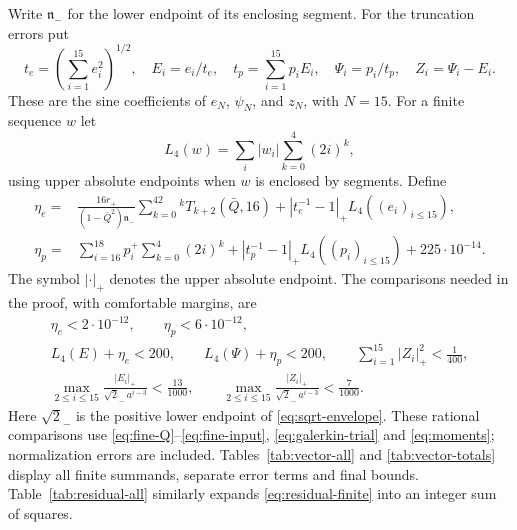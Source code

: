 Write $\mathfrak n_-$ for the lower endpoint of its enclosing segment. For the truncation errors put
\[
 t_e=\left(\sum_{i=1}^{15}e_i^2\right)^{1/2},\quad
 E_i=e_i/t_e,\quad t_p=\sum_{i=1}^{15}p_iE_i,\quad
 \Psi_i=p_i/t_p,\quad Z_i=\Psi_i-E_i.
\]
These are the sine coefficients of $e_N$, $\psi_N$, and $z_N$, with $N=15$. For a finite sequence $w$ let
\[
 L_4(w)=\sum_i |w_i|\sum_{k=0}^4(2i)^k,
\]
using upper absolute endpoints when $w$ is enclosed by segments. Define
\begin{align}
 \eta_e={}&\frac{16r_+}{(1-\bar Q^2)\mathfrak n_-}
 \sum_{k=0}^42^kT_{k+2}(\bar Q,16)
 +|t_e^{-1}-1|_+L_4((e_i)_{i\le15}),\label{eq:eta-e}\\
 \eta_p={}&\sum_{i=16}^{18}p_i^+\sum_{k=0}^4(2i)^k
 +|t_p^{-1}-1|_+L_4((p_i)_{i\le15})+225\cdot10^{-14}.
 \label{eq:eta-p}
\end{align}
The symbol $|\cdot|_+$ denotes the upper absolute endpoint. The comparisons needed in the proof, with comfortable margins, are
\begin{equation}\label{eq:vector-scalar-checks}
\begin{gathered}
 \eta_e<2\cdot10^{-12},\qquad \eta_p<6\cdot10^{-12},\\
 L_4(E)+\eta_e<200,
 \qquad L_4(\Psi)+\eta_p<200,
 \qquad\sum_{i=1}^{15}|Z_i|_+^2<\tfrac1{400},\\
 \max_{2\le i\le15}\frac{|E_i|_+}{\sqrt2_-\,a^{i-3}}<\tfrac{13}{1000},
 \qquad
 \max_{2\le i\le15}\frac{|Z_i|_+}{\sqrt2_-\,a^{i-3}}<\tfrac7{1000}.
\end{gathered}
\end{equation}
Here $\sqrt2_-$ is the positive lower endpoint of \eqref{eq:sqrt-envelope}. These rational comparisons use \eqref{eq:fine-Q}--\eqref{eq:fine-input}, \eqref{eq:galerkin-trial} and \eqref{eq:moments}; normalization errors are included. Tables~\ref{tab:vector-all} and \ref{tab:vector-totals} display all finite summands, separate error terms and final bounds. Table~\ref{tab:residual-all} similarly expands \eqref{eq:residual-finite} into an integer sum of squares.

